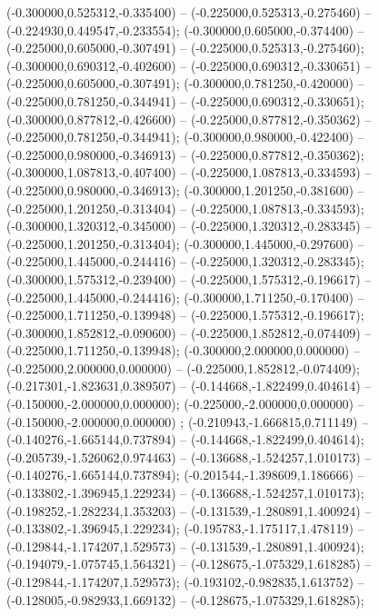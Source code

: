  (-0.300000,0.525312,-0.335400) -- (-0.225000,0.525313,-0.275460) -- (-0.224930,0.449547,-0.233554);
 (-0.300000,0.605000,-0.374400) -- (-0.225000,0.605000,-0.307491) -- (-0.225000,0.525313,-0.275460);
 (-0.300000,0.690312,-0.402600) -- (-0.225000,0.690312,-0.330651) -- (-0.225000,0.605000,-0.307491);
 (-0.300000,0.781250,-0.420000) -- (-0.225000,0.781250,-0.344941) -- (-0.225000,0.690312,-0.330651);
 (-0.300000,0.877812,-0.426600) -- (-0.225000,0.877812,-0.350362) -- (-0.225000,0.781250,-0.344941);
 (-0.300000,0.980000,-0.422400) -- (-0.225000,0.980000,-0.346913) -- (-0.225000,0.877812,-0.350362);
 (-0.300000,1.087813,-0.407400) -- (-0.225000,1.087813,-0.334593) -- (-0.225000,0.980000,-0.346913);
 (-0.300000,1.201250,-0.381600) -- (-0.225000,1.201250,-0.313404) -- (-0.225000,1.087813,-0.334593);
 (-0.300000,1.320312,-0.345000) -- (-0.225000,1.320312,-0.283345) -- (-0.225000,1.201250,-0.313404);
 (-0.300000,1.445000,-0.297600) -- (-0.225000,1.445000,-0.244416) -- (-0.225000,1.320312,-0.283345);
 (-0.300000,1.575312,-0.239400) -- (-0.225000,1.575312,-0.196617) -- (-0.225000,1.445000,-0.244416);
 (-0.300000,1.711250,-0.170400) -- (-0.225000,1.711250,-0.139948) -- (-0.225000,1.575312,-0.196617);
 (-0.300000,1.852812,-0.090600) -- (-0.225000,1.852812,-0.074409) -- (-0.225000,1.711250,-0.139948);
 (-0.300000,2.000000,0.000000) -- (-0.225000,2.000000,0.000000) -- (-0.225000,1.852812,-0.074409);
 (-0.217301,-1.823631,0.389507) -- (-0.144668,-1.822499,0.404614) -- (-0.150000,-2.000000,0.000000);
 (-0.225000,-2.000000,0.000000) -- (-0.150000,-2.000000,0.000000) ;
 (-0.210943,-1.666815,0.711149) -- (-0.140276,-1.665144,0.737894) -- (-0.144668,-1.822499,0.404614);
 (-0.205739,-1.526062,0.974463) -- (-0.136688,-1.524257,1.010173) -- (-0.140276,-1.665144,0.737894);
 (-0.201544,-1.398609,1.186666) -- (-0.133802,-1.396945,1.229234) -- (-0.136688,-1.524257,1.010173);
 (-0.198252,-1.282234,1.353203) -- (-0.131539,-1.280891,1.400924) -- (-0.133802,-1.396945,1.229234);
 (-0.195783,-1.175117,1.478119) -- (-0.129844,-1.174207,1.529573) -- (-0.131539,-1.280891,1.400924);
 (-0.194079,-1.075745,1.564321) -- (-0.128675,-1.075329,1.618285) -- (-0.129844,-1.174207,1.529573);
 (-0.193102,-0.982835,1.613752) -- (-0.128005,-0.982933,1.669132) -- (-0.128675,-1.075329,1.618285);
